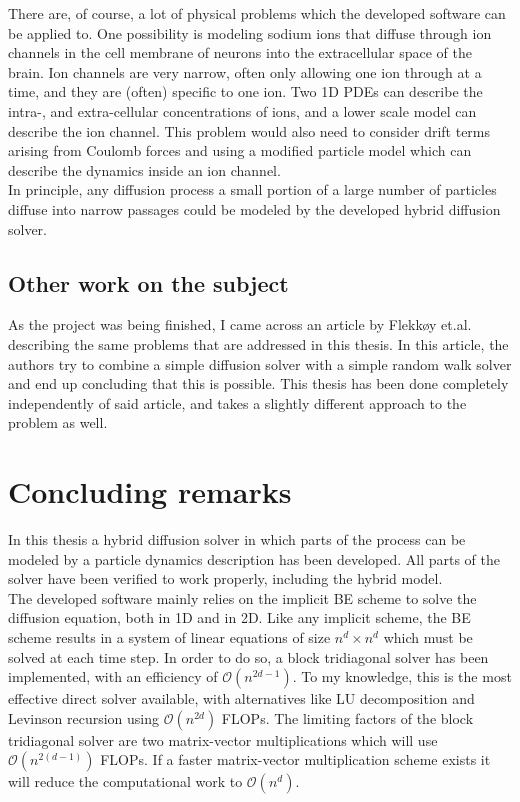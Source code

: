 There are, of course, a lot of physical problems which the developed software can be applied to. 
One possibility is modeling sodium ions that diffuse through ion channels in the cell membrane of neurons into the extracellular space of the brain. 
Ion channels are very narrow, often only allowing one ion through at a time, and they are (often) specific to one ion. 
Two 1D PDEs can describe the intra-, and extra-cellular concentrations of ions, and a lower scale model can describe the ion channel. 
This problem would also need to consider drift terms arising from Coulomb forces and using a modified particle model which can describe the dynamics inside an ion channel. \\

In principle, any diffusion process a small portion of a large number of particles diffuse into narrow passages could be modeled by the developed hybrid diffusion solver.

\subsection{Other work on the subject}

As the project was being finished, I came across an article by Flekkøy et.al.\cite{flekkoy2001coupling} describing the same problems that are addressed in this thesis. 
In this article, the authors try to combine a simple diffusion solver with a simple random walk solver and end up concluding that this is possible. 
This thesis has been done completely independently of said article, and takes a slightly different approach to the problem as well. \\



\section{Concluding remarks}

In this thesis a hybrid diffusion solver in which parts of the process can be modeled by a particle dynamics description has been developed. 
All parts of the solver have been verified to work properly, including the hybrid model. \\


The developed software mainly relies on the implicit BE scheme to solve the diffusion equation, both in 1D and in 2D. 
Like any implicit scheme, the BE scheme results in a system of linear equations of size $n^d\times n^d$ which must be solved at each time step. 
In order to do so, a block tridiagonal solver has been implemented, with an efficiency of $\mathcal{O}(n^{2d-1})$. 
To my knowledge, this is the most effective direct solver available, with alternatives like LU decomposition and Levinson recursion using $\mathcal{O}(n^{2d})$ FLOPs. 
The limiting factors of the block tridiagonal solver are two matrix-vector multiplications which will use $\mathcal{O}(n^{2(d-1)})$ FLOPs. 
If a faster matrix-vector multiplication scheme exists it will reduce the computational work to $\mathcal{O}(n^d)$. \\

